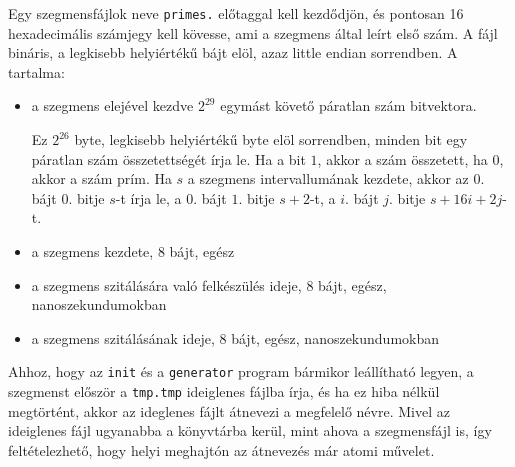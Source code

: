 Egy szegmensfájlok neve \texttt{primes.} előtaggal kell kezdődjön, és pontosan 16 hexadecimális számjegy kell kövesse, ami a szegmens által leírt első szám.
A fájl bináris, a legkisebb helyiértékű bájt elöl, azaz little endian sorrendben.
A tartalma:
\begin{itemize}
\item a szegmens elejével kezdve $2^{29}$ egymást követő páratlan szám bitvektora.
	
Ez $2^{26}$ byte, legkisebb helyiértékű byte elöl sorrendben, minden bit egy páratlan szám összetettségét írja le.
Ha a bit $1$, akkor a szám összetett, ha $0$, akkor a szám prím.
Ha $s$ a szegmens intervallumának kezdete, akkor az $0.$ bájt $0.$ bitje $s$-t írja le, a $0.$ bájt $1.$ bitje $s+2$-t, a $i.$ bájt $j.$ bitje $s+16i+2j$-t.
	
\item a szegmens kezdete, 8 bájt, egész
\item a szegmens szitálására való felkészülés ideje, 8 bájt, egész, nanoszekundumokban
\item a szegmens szitálásának ideje, 8 bájt, egész, nanoszekundumokban
\end{itemize}

Ahhoz, hogy az \texttt{init} és a \texttt{generator} program bármikor leállítható legyen, a szegmenst először a \texttt{tmp.tmp} ideiglenes fájlba írja, és ha ez hiba nélkül megtörtént, akkor az ideglenes fájlt átnevezi a megfelelő névre.
Mivel az ideiglenes fájl ugyanabba a könyvtárba kerül, mint ahova a szegmensfájl is, így feltételezhető, hogy helyi meghajtón az átnevezés már atomi művelet.


